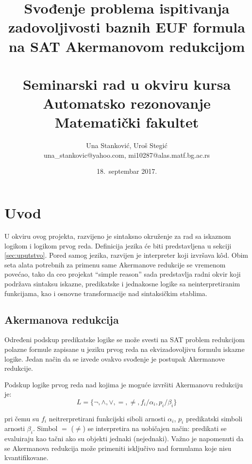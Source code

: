 \documentclass[a4paper]{article}
\begin{document}
\title{Svođenje problema ispitivanja zadovoljivosti baznih EUF formula na SAT Akermanovom redukcijom \\ \small{~\\Seminarski rad u okviru kursa\\Automatsko rezonovanje\\ Matematički fakultet}}

\author{
	Una Stanković, Uroš Stegić\\
	una\_stankovic@yahoo.com, mi10287@alas.matf.bg.ac.rs}
\date{18.~septembar 2017.}
\maketitle


\tableofcontents

\newpage


\section{Uvod}
\label{sec:uvod}
U okviru ovog projekta, razvijeno je sintaksno okruženje za rad sa iskaznom logikom i logikom prvog reda. Definicija jezika će biti predstavljena u sekciji \ref{sec:uputstvo}. Pored samog jezika, razvijen je interpreter koji izvršava k\^od. Obim seta alata potrebnih za primenu same Akermanove redukcije se vremenom povećao, tako da ceo projekat ``simple reason'' sada predstavlja radni okvir koji podržava sintaksu iskazne, predikatske i jednakosne logike sa neinterpretiranim funkcijama, kao i osnovne transformacije nad sintaksičkim stablima.

\subsection{Akermanova redukcija}
Određeni podskup predikatske logike se može svesti na SAT problem redukcijom polazne formule zapisane u jeziku prvog reda na ekvizadovoljivu formulu iskazne logike. Jedan način da se izvede ovakvo svođenje je postupak Akermanove redukcije.

Podskup logike prvog reda nad kojima je moguće izvršiti Akermanovu redukciju je:
$$ L = \{\neg, \land, \lor, =, \neq, f_i/\alpha_i, p_i/\beta_i\}$$

pri čemu su $f_i$ neitrerpretirani funkcijski siboli arnosti $\alpha_i$, $p_i$ predikatski simboli arnosti $\beta_i$. Simbol $=$ ($\neq$) se interpretira na uobičajen način: predikati se evaluiraju kao tačni ako su objekti jednaki (nejednaki). Važno je napomenuti da se Akermanova redukcija može primeniti isključivo nad formulama koje nisu kvantifikovane.
\end{document}
